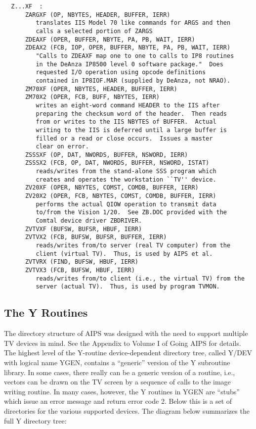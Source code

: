 \begin{verbatim}
  Z...XF  :
      ZARGXF (OP, NBYTES, HEADER, BUFFER, IERR)
         translates IIS Model 70 like commands for ARGS and then
         calls a selected portion of ZARGS
      ZDEAXF (OPER, BUFFER, NBYTE, PA, PB, WAIT, IERR)
      ZDEAX2 (FCB, IOP, OPER, BUFFER, NBYTE, PA, PB, WAIT, IERR)
         "Calls to ZDEAXF map one to one to calls to IP8 routines
         in the DeAnza IP8500 level 0 software package."  Does
         requested I/O operation using opcode definitions
         contained in IP8IOF.MAR (supplied by DeAnza, not NRAO).
      ZM70XF (OPER, NBYTES, HEADER, BUFFER, IERR)
      ZM70X2 (OPER, FCB, BUFF, NBYTES, IERR)
         writes an eight-word command HEADER to the IIS after
         preparing the checksum word of the header.  Then reads
         from or writes to the IIS NBYTES of BUFFER.  Actual
         writing to the IIS is deferred until a large buffer is
         filled or a read or close occurs.  Issues a master
         clear on error.
      ZSSSXF (OP, DAT, NWORDS, BUFFER, NSWORD, IERR)
      ZSSSX2 (FCB, OP, DAT, NWORDS, BUFFER, NSWORD, ISTAT)
         reads/writes from the stand-alone SSS program which
         creates and operates the workstation ``TV'' device.
      ZV20XF (OPER, NBYTES, COMST, COMDB, BUFFER, IERR)
      ZV20X2 (OPER, FCB, NBYTES, COMST, COMDB, BUFFER, IERR)
         performs the actual QIOW operation to transmit data
         to/from the Vision 1/20.  See ZB.DOC provided with the
         Comtal device driver ZBDRIVER.
      ZVTVXF (BUFSW, BUFSR, HBUF, IERR)
      ZVTVX2 (FCB, BUFSW, BUFSR, BUFFER, IERR)
         reads/writes from/to server (real TV computer) from the
         client (virtual TV).  Thus, is used by AIPS et al.
      ZVTVRX (FIND, BUFSW, HBUF, IERR)
      ZVTVX3 (FCB, BUFSW, HBUF, IERR)
         reads/writes from/to client (i.e., the virtual TV) from the
         server (actual TV).  Thus, is used by program TVMON.
\end{verbatim}

\subsection{The Y Routines}
The directory structure of AIPS was designed with the need to
support multiple TV devices in mind.  See the Appendix to Volume I of
Going AIPS for details.  The highest level of the Y-routine
device-dependent directory tree, called Y/DEV with logical name YGEN,
contains a ``generic'' version of the Y subroutine library.  In some
cases, there really can be a generic version of a routine, i.e.,
vectors can be drawn on the TV screen by a sequence of calls to the
image writing routine.  In many cases, however, the Y routines in YGEN
are ``stubs'' which issue an error message and return error code 2.
Below this is a set of directories for the various supported devices.
The diagram below summarizes the full Y directory tree:

